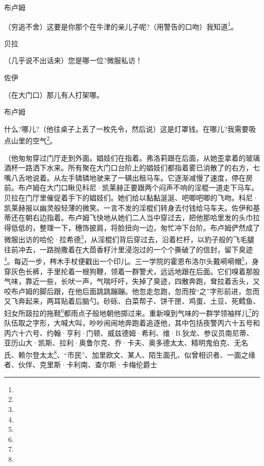 \par 布卢姆
\par （穷追不舍）这要是你那个在牛津的亲儿子呢?（用警告的口吻）我知道\footnote{}。
\par 贝拉
\par （几乎说不出话来）您是哪一位?微服私访！
\par 佐伊
\par （在大门口）那儿有人打架哪。
\par 布卢姆
\par 什么?哪儿?（他往桌子上丢了一枚先令，然后说）这是灯罩钱。在哪儿?我需要吸点山里的空气\footnote{}。
\par （他匆匆穿过门厅走到外面。娼妓们在指着。弗洛莉跟在后面，从她歪拿着的玻璃酒杯一路洒下水来。所有聚在大门口台阶上的娼妓们都指着雾已消散了的右方，七嘴八舌地说着。从左手辚辚地驶来了一辆出租马车。它逐渐减慢了速度，停在房前。布卢姆在大门口瞅见科尼·凯莱赫正要跟两个闷声不响的淫棍一道走下马车。贝拉在门厅里催促着手下的娼妓们。她们给以黏黏涎涎、吧唧吧唧的飞吻。科尼·凯莱赫报以幽灵般轻薄的微笑。一言不发的淫棍们转身去付钱给马车夫。佐伊和基蒂还在朝右边指着。布卢姆飞快地从她们二人当中穿过去，把他那哈里发的头巾拉得低低的，整理一下，穗饰披肩，将脸扭向一边，匆忙冲下台阶。布卢姆俨然成了微服出访的哈伦·拉希德\footnote{}，从淫棍们背后穿过去，沿着栏杆，以豹子般的飞毛腿往前冲去，一路抛撒着在大茴香籽汁里浸泡过的一个个撕破了的信封，留下臭迹\footnote{}。每迈一步，梣木手杖便戳出一个印儿。三一学院的霍恩布洛尔头戴嗬嗬帽\footnote{}，身穿灰色长裤，手里抡着一根狗鞭，领着一群警犬，远远地跟在后面。它们嗅着那股气味，靠近一些，长吠一声，气喘吁吁，失掉了臭迹，四散奔跑，耷拉着舌头，又咬布卢姆的脚后跟，在他后面跳跳蹦蹦。他忽走忽跑，忽而按“之”字形前进，忽而又飞奔起来，两耳贴着后脑勺。砂砾、白菜帮子、饼干匣、鸡蛋、土豆、死鳕鱼、妇女所趿拉的拖鞋\footnote{}都雨点子般地朝他掷过来。重新嗅到气味的一群学领袖样儿\footnote{}的队伍取之字形，大喊大叫，吵吵闹闹地奔跑着追逐他，其中包括夜警丙六十五号和丙六十六号、约翰·亨利·门顿、威兹德姆·希利、维·B.狄龙、参议员南尼蒂、亚历山大·凯斯、拉利·奥鲁尔克、乔·卡夫、奥多德太太、精明鬼伯克、无名氏、赖尔登太太\footnote{}、“市民”、加里欧文、某人、陌生面孔、似曾相识者、一面之缘者、伙伴、克里斯·卡利南、查尔斯·卡梅伦爵士\